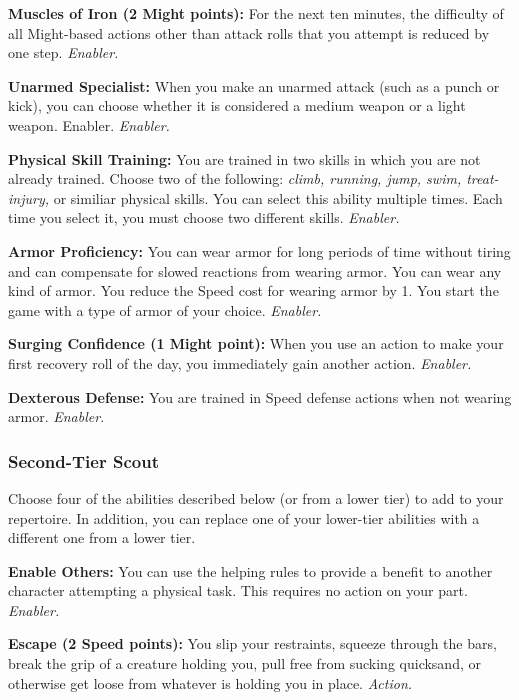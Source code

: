 \documentclass[a4paper,10pt,final,twocolumn,oneside]{book}
\newcommand{\itemAbility}[2]{\textcolor{25gray}{\textbullet\textbf{ #1:}}{ #2}\par}
\newcommand{\enabler}{\textit{ Enabler.}}
\newcommand{\action}{\textit{ Action.}}
\begin{document}
\itemAbility{Muscles of Iron (2 Might points)}{For the next ten minutes, the difficulty of all Might-based actions other than attack rolls that you attempt is reduced by one step.\enabler}

\itemAbility{Unarmed Specialist}{When you make an unarmed attack (such as a punch or kick), you can choose whether it is considered a medium weapon or a light weapon. Enabler.\enabler}

\itemAbility{Physical Skill Training}{You are trained in two skills in which you are not already trained. Choose two of the following: \textit{climb, running, jump, swim, treat-injury,} or similiar physical skills. You can select this ability multiple times. Each time you select it, you must choose two different skills.\enabler}

\itemAbility{Armor Proficiency}{You can wear armor for long periods of time without tiring and can compensate for slowed reactions from wearing armor. You can wear any kind of armor. You reduce the Speed cost for wearing armor by 1. You start the game with a type of armor of your choice.\enabler}

\itemAbility{Surging Confidence (1 Might point)}{When you use an action to make your first recovery roll of the day, you immediately gain another action.\enabler}

\itemAbility{Dexterous Defense}{You are trained in Speed defense actions when not wearing armor.\enabler}


\subsubsection*{Second-Tier Scout}
\label{subsub:scoutSecondTier}

Choose four of the abilities described
below (or from a lower tier) to add to your
repertoire. In addition, you can replace one
of your lower-tier abilities with a different
one from a lower tier.

\itemAbility{Enable Others}{You can use the helping rules to provide a benefit to another character attempting a physical task. This requires no action on your part.\enabler}

\itemAbility{Escape (2 Speed points)}{You slip your restraints, squeeze through the bars, break the grip of a creature holding you, pull free from sucking quicksand, or otherwise get loose from whatever is holding you in place.\action}
\end{document}
